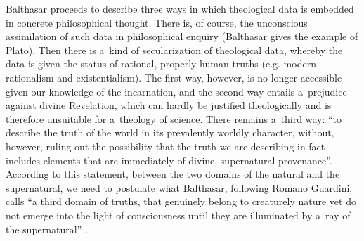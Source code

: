 Balthasar proceeds to describe three ways in which theological data is embedded in concrete philosophical thought. There is, of course, the unconscious assimilation of such data in philosophical enquiry (Balthasar gives the example of Plato). Then there is a~kind of secularization of theological data, whereby the data is given the status of rational, properly human truths (e.g. modern rationalism and existentialism). The first way, however, is no longer accessible given our knowledge of the incarnation, and the second way entails a~prejudice against divine Revelation, which can hardly be justified theologically and is therefore unsuitable for a~theology of science. There remains a~third way: ``to describe the truth of the world in its prevalently worldly character, without, however, ruling out the possibility that the truth we are describing in fact includes elements that are immediately of divine, supernatural provenance''. According to this statement, between the two domains of the natural and the supernatural, we need to postulate what Balthasar, following Romano Guardini, calls ``a third domain of truths, that genuinely belong to creaturely nature yet do not emerge into the light of consciousness until they are illuminated by a~ray of the supernatural'' 
\parencite[][p.12]{balthasar_theo-logic_2000}.%




